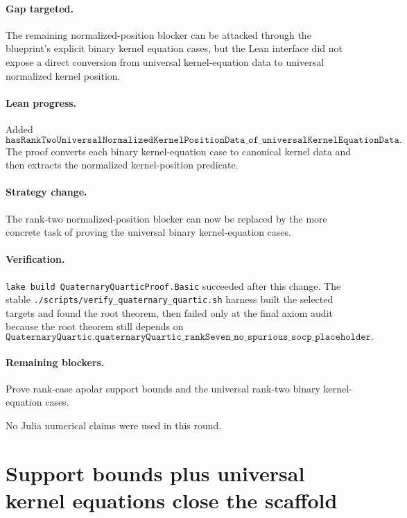 \documentclass[11pt]{article}
\begin{document}
\paragraph{Gap targeted.}
The remaining normalized-position blocker can be attacked through the blueprint's
explicit binary kernel equation cases, but the Lean interface did not expose a
direct conversion from universal kernel-equation data to universal normalized
kernel position.

\paragraph{Lean progress.}
Added
\[
\texttt{hasRankTwoUniversalNormalizedKernelPositionData\_of\_universalKernelEquationData}.
\]
The proof converts each binary kernel-equation case to canonical kernel data and
then extracts the normalized kernel-position predicate.

\paragraph{Strategy change.}
The rank-two normalized-position blocker can now be replaced by the more
concrete task of proving the universal binary kernel-equation cases.

\paragraph{Verification.}
\texttt{lake build QuaternaryQuarticProof.Basic} succeeded after this change.
The stable \texttt{./scripts/verify\_quaternary\_quartic.sh} harness built the
selected targets and found the root theorem, then failed only at the final axiom
audit because the root theorem still depends on
\[
\texttt{QuaternaryQuartic.quaternaryQuartic\_rankSeven\_no\_spurious\_socp\_placeholder}.
\]

\paragraph{Remaining blockers.}
Prove rank-case apolar support bounds and the universal rank-two binary
kernel-equation cases.

No Julia numerical claims were used in this round.

\section*{Support bounds plus universal kernel equations close the scaffold}
\end{document}

